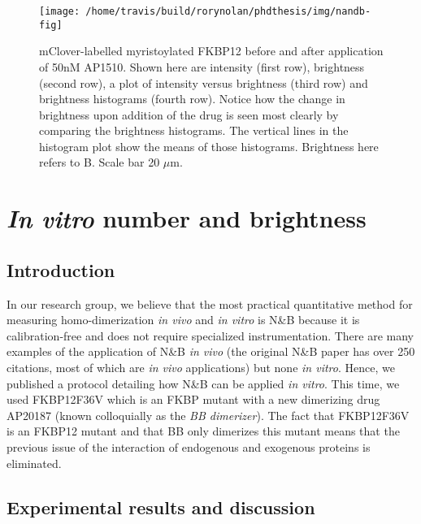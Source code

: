\documentclass[12pt,]{book}
\theoremstyle{definition}
\theoremstyle{definition}
\theoremstyle{definition}
\theoremstyle{remark}
\begin{document}
\begin{figure}

\texttt{[image: /home/travis/build/rorynolan/phdthesis/img/nandb-fig]} \hfill{}

\caption{mClover-labelled myristoylated FKBP12 before and
after application of 50nM AP1510. Shown here are intensity (first row),
brightness (second row), a plot of intensity versus brightness (third
row) and brightness histograms (fourth row). Notice how the change in
brightness upon addition of the drug is seen most clearly by comparing
the brightness histograms. The vertical lines in the histogram plot show
the means of those histograms. Brightness here refers to B. Scale bar 20
\(\mu\)m. \citep{nandb}}\label{fig:nandb-fig}
\end{figure}

\section{\texorpdfstring{\emph{In vitro} number and
brightness}{In vitro number and brightness}}\label{in-vitro-NB}

\subsection{Introduction}\label{introduction-1}

In our research group, we believe that the most practical quantitative
method for measuring homo-dimerization \emph{in vivo} and \emph{in
vitro} is N\&B \citep{NB} because it is calibration-free and does not
require specialized instrumentation. There are many examples of the
application of N\&B \emph{in vivo} (the original N\&B paper has over 250
citations, most of which are \emph{in vivo} applications) but none
\emph{in vitro}. Hence, we published a protocol \citep{JOVE} detailing
how N\&B can be applied \emph{in vitro}. This time, we used FKBP12F36V
which is an FKBP mutant with a new dimerizing drug AP20187 (known
colloquially as the \emph{BB dimerizer}). The fact that FKBP12F36V is an
FKBP12 mutant and that BB only dimerizes this mutant means that the
previous issue of the interaction of endogenous and exogenous proteins
is eliminated.

\subsection{Experimental results and
discussion}\label{experimental-results-and-discussion-1}
\end{document}
